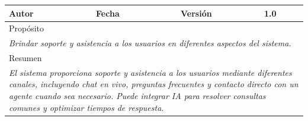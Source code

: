 \begin{table}[H]
\begin{tabular}{|llllllll|}
    \multicolumn{1}{|l|}{Autor}                          & \multicolumn{1}{l|}{}                                    & \multicolumn{2}{l|}{Fecha}                                    & \multicolumn{1}{l|}{}                  & \multicolumn{2}{l|}{Versión}                                   & 1.0                                        \\ \hline
    \multicolumn{8}{|l|}{\cellcolor[HTML]{F2F2F2}Propósito}                                                                                                                                                                                                                                                                                \\ \hline
    \multicolumn{8}{|p{15cm}|}{{\color[HTML]{808080} \textit{Brindar soporte y asistencia a los usuarios en diferentes aspectos del sistema.}}}                                                                                                                                                                                                  \\ \hline
    \multicolumn{8}{|l|}{\cellcolor[HTML]{F2F2F2}Resumen}                                                                                                                                                                                                                                                                                  \\ \hline
    \multicolumn{8}{|p{15cm}|}{{\color[HTML]{999999} \textit{El sistema proporciona soporte y asistencia a los usuarios mediante diferentes canales, incluyendo chat en vivo, preguntas frecuentes y contacto directo con un agente cuando sea necesario. Puede integrar IA para resolver consultas comunes y optimizar tiempos de respuesta.}}} \\ \hline
    \end{tabular}
    \end{table}

